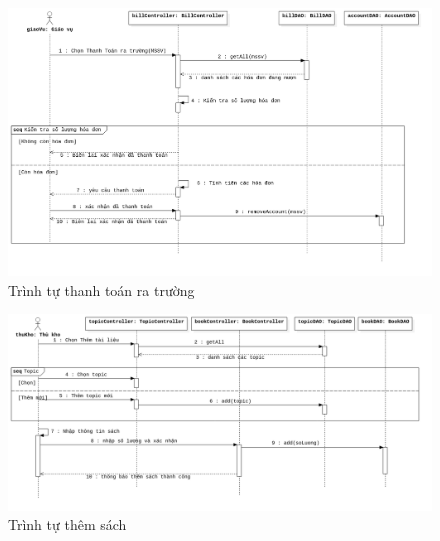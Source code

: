 \begin{figure}[H]
\centering
\includegraphics[width=\textwidth]{figures/thanhtoanratruongseq.png}
\caption{Trình tự thanh toán ra trường}
\end{figure}

\begin{figure}[H]
\centering
\includegraphics[width=\textwidth]{figures/themTlseq.png}
\caption{Trình tự thêm sách}
\end{figure}


